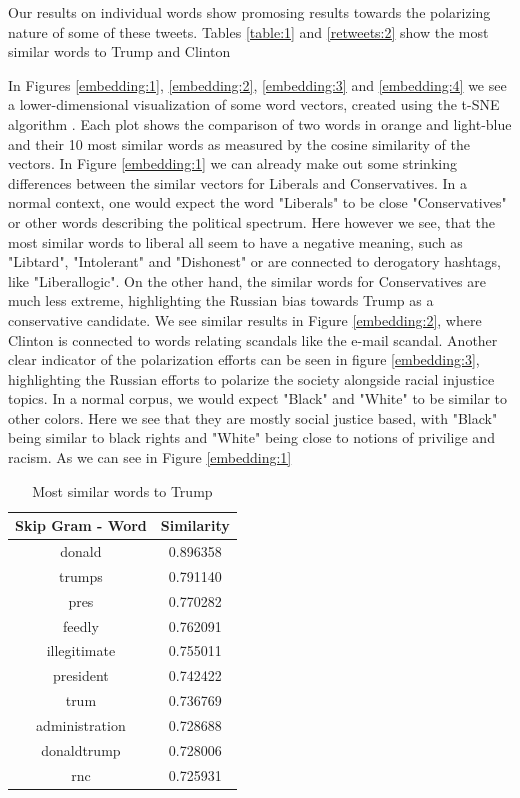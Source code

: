 \documentclass[12pt, authoryear]{elsarticle}
\begin{document}
Our results on individual words show promosing results towards the polarizing nature of some of these tweets. Tables \ref{table:1} and \ref{retweets:2} show the most similar words to Trump and Clinton

In Figures \ref{embedding:1}, \ref{embedding:2}, \ref{embedding:3} and \ref{embedding:4} we see a lower-dimensional visualization of some word vectors, created using the t-SNE algorithm \cite{pmaaten2008visualizing}. Each plot shows the comparison of two words in orange and light-blue and their 10 most similar words as measured by the cosine similarity of the vectors. In Figure \ref{embedding:1} we can already make out some strinking differences between the similar vectors for Liberals and Conservatives. In a normal context, one would expect the word "Liberals" to be close "Conservatives" or other words describing the political spectrum. Here however we see, that the most similar words to liberal all seem to have a negative meaning, such as "Libtard", "Intolerant" and "Dishonest" or are connected to derogatory hashtags, like "Liberallogic". On the other hand, the similar words for Conservatives are much less extreme, highlighting the Russian bias towards Trump as a conservative candidate. We see similar results in Figure \ref{embedding:2}, where Clinton is connected to words relating scandals like the e-mail scandal. Another clear indicator of the polarization efforts can be seen in figure \ref{embedding:3}, highlighting the Russian efforts to polarize the society alongside racial injustice topics. In a normal corpus, we would expect "Black" and "White" to be similar to other colors. Here we see that they are mostly social justice based, with "Black" being similar to black rights and "White" being close to notions of privilige and racism. 
As we can see in Figure \ref{embedding:1}

\begin{center}
\begin{table}[H]
\begin{tabular}{ c c } 
Skip Gram - Word   &  Similarity \\
 \hline
donald   &  0.896358\\
trumps   &  0.791140\\
pres   &  0.770282\\
feedly   &  0.762091\\
illegitimate  &   0.755011\\
president   &  0.742422\\
trum   &  0.736769\\
administration  &   0.728688\\
donaldtrump   &  0.728006\\
rnc   &  0.725931\\
 \hline
\end{tabular}
\caption{Most similar words to Trump}
\label{table:5}
\end{table}
\end{center}
\end{document}
